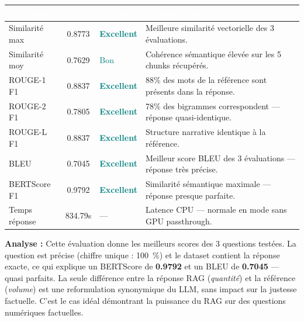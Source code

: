 \documentclass[12pt,a4paper]{report}
\begin{document}
\vspace{6pt}
\begin{center}
\small
\begin{tabular}{|l|c|l|p{5.5cm}|}
  \hline
  \rowcolor{mainblue}
  \textcolor{white}{\textbf{Métrique}} &
  \textcolor{white}{\textbf{Score}} &
  \textcolor{white}{\textbf{Niveau}} &
  \textcolor{white}{\textbf{Interprétation}} \\
  \hline
  Similarité max & 0.8773 & \textcolor{teal}{\textbf{Excellent}} &
    Meilleure similarité vectorielle des 3 évaluations. \\
  \rowcolor{lightblue}
  Similarité moy & 0.7629 & \textcolor{teal}{Bon} &
    Cohérence sémantique élevée sur les 5 chunks récupérés. \\
  ROUGE-1 F1 & 0.8837 & \textcolor{teal}{\textbf{Excellent}} &
    88\% des mots de la référence sont présents dans la réponse. \\
  \rowcolor{lightblue}
  ROUGE-2 F1 & 0.7805 & \textcolor{teal}{\textbf{Excellent}} &
    78\% des bigrammes correspondent — réponse quasi-identique. \\
  ROUGE-L F1 & 0.8837 & \textcolor{teal}{\textbf{Excellent}} &
    Structure narrative identique à la référence. \\
  \rowcolor{lightblue}
  BLEU & 0.7045 & \textcolor{teal}{\textbf{Excellent}} &
    Meilleur score BLEU des 3 évaluations — réponse très précise. \\
  BERTScore F1 & 0.9792 & \textcolor{teal}{\textbf{Excellent}} &
    Similarité sémantique maximale — réponse presque parfaite. \\
  \hline
  Temps réponse & 834.79s & — &
    Latence CPU — normale en mode sans GPU passthrough. \\
  \hline
\end{tabular}
\end{center}

\begin{infobox}
\textbf{Analyse :} Cette évaluation donne les meilleurs scores des 3 questions
testées. La question est précise (chiffre unique : 100~\%) et le dataset contient
la réponse exacte, ce qui explique un BERTScore de \textbf{0.9792} et un BLEU
de \textbf{0.7045} — quasi parfaits. La seule différence entre la réponse RAG
(\textit{quantité}) et la référence (\textit{volume}) est une reformulation
synonymique du LLM, sans impact sur la justesse factuelle. C'est le cas idéal
démontrant la puissance du RAG sur des questions numériques factuelles.
\end{infobox}
\end{document}
